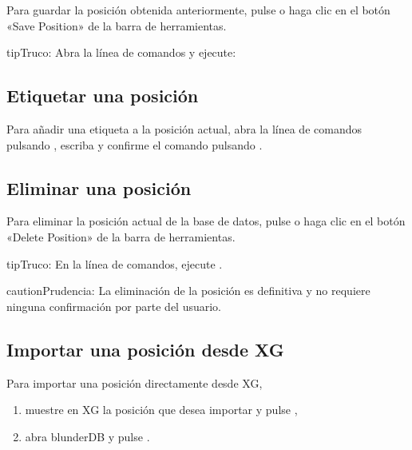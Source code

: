 \documentclass[letterpaper,10pt,spanish]{sphinxmanual}
\begin{document}
\sphinxAtStartPar
Para guardar la posición obtenida anteriormente, pulse  o haga clic en el botón «Save Position» de la barra de herramientas.

\begin{sphinxadmonition}{tip}{Truco:}
\sphinxAtStartPar
Abra la línea de comandos y ejecute: 
\end{sphinxadmonition}


\subsection{Etiquetar una posición}
\label{\detokenize{guide_utilisateur:etiqueter-une-position}}
\sphinxAtStartPar
Para añadir una etiqueta  a la posición actual, abra la línea de comandos pulsando , escriba  y confirme el comando pulsando .


\subsection{Eliminar una posición}
\label{\detokenize{guide_utilisateur:supprimer-une-position}}
\sphinxAtStartPar
Para eliminar la posición actual de la base de datos, pulse  o haga clic en el botón «Delete Position» de la barra de herramientas.

\begin{sphinxadmonition}{tip}{Truco:}
\sphinxAtStartPar
En la línea de comandos, ejecute .
\end{sphinxadmonition}

\begin{sphinxadmonition}{caution}{Prudencia:}
\sphinxAtStartPar
La eliminación de la posición es definitiva y no requiere ninguna confirmación por parte del usuario.
\end{sphinxadmonition}


\subsection{Importar una posición desde XG}
\label{\detokenize{guide_utilisateur:import-une-position-depuis-xg}}
\sphinxAtStartPar
Para importar una posición directamente desde XG,
\begin{enumerate}
%
\item {} 
\sphinxAtStartPar
muestre en XG la posición que desea importar y pulse ,

\item {} 
\sphinxAtStartPar
abra blunderDB y pulse .

\end{enumerate}
\end{document}
